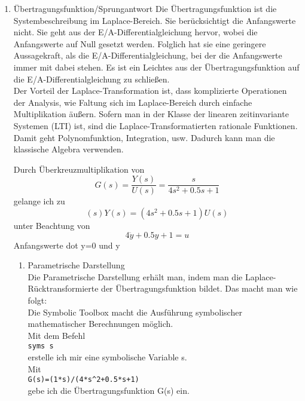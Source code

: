 \begin{enumerate}
    \item{Übertragungsfunktion/Sprungantwort}
        Die Übertragungsfunktion ist die Systembeschreibung im Laplace-Bereich.
        Sie berücksichtigt die Anfangswerte nicht.
        Sie geht aus der E/A-Differentialgleichung hervor, wobei die Anfangswerte auf Null gesetzt werden.
        Folglich hat sie eine geringere Aussagekraft, als die E/A-Differentialgleichung, bei der die Anfangswerte immer mit dabei stehen.
        Es ist ein Leichtes aus der Übertragungsfunktion auf die E/A-Differentialgleichung zu schließen.\\
        Der Vorteil der Laplace-Transformation ist, dass komplizierte Operationen der Analysis, wie Faltung sich im Laplace-Bereich durch einfache Multiplikation äußern.
        Sofern man in der Klasse der linearen zeitinvariante Systemen (LTI) ist, sind die Laplace-Transformatierten rationale Funktionen. 
        Damit geht Polynomfunktion, Integration, usw.
        Dadurch kann man die klassische Algebra verwenden.

        

        Durch Überkreuzmultiplikation von 
            \begin{equation}
                G(s)=\frac{Y(s)}{U(s)}=\frac{s}{4s^2+0.5s+1}
            \end{equation}
        gelange ich zu
            \begin{equation}
                (s)Y(s) = (4s^2+0.5s+1)U(s)
            \end{equation}
        unter Beachtung von
            \begin{equation}
                4\ddot{y}+0.5y+1=u
            \end{equation}
            Anfangswerte dot y=0 und y

        \begin{enumerate}
            \item{Parametrische Darstellung}\\
                Die Parametrische Darstellung erhält man, indem man die Laplace-Rücktransformierte der Übertragungsfunktion bildet.
                Das macht man wie folgt:\\
                    Die Symbolic Toolbox macht die Ausführung symbolischer mathematischer Berechnungen möglich.\\
                    Mit dem Befehl\\
                        \texttt{syms s}\\
                    erstelle ich mir eine symbolische Variable s.\\
                    Mit\\
                        \texttt{G(s)=(1*s)/(4*s\^{}2+0.5*s+1)}\\
                    gebe ich die Übertragungsfunktion G(s) ein.
                    

\end{enumerate}
\end{enumerate}
